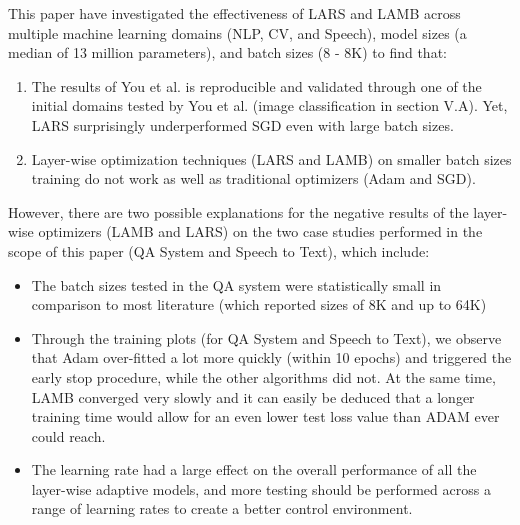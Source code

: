 This paper have investigated the effectiveness of LARS and LAMB across multiple machine learning domains (NLP, CV, and Speech), model sizes (a median of 13 million parameters), and batch sizes (8 - 8K) to find that:  

\begin{enumerate}
    \item The results of You et al. is reproducible and validated through  one of the initial domains tested by You et al.  \cite{You2020Large} (image classification in section V.A). Yet, LARS surprisingly underperformed SGD even with large batch sizes.
    \item Layer-wise optimization techniques (LARS and LAMB) on smaller batch sizes training do not work as well as traditional optimizers (Adam and SGD). 
\end{enumerate}

However, there are two possible explanations for the negative results of the layer-wise optimizers (LAMB and LARS) on the two case studies performed in the scope of this paper (QA System and Speech to Text), which include: 
\begin{itemize}
    \item The batch sizes tested in the QA system were statistically small in comparison to most literature (which reported sizes of 8K and up to 64K)
    \item Through the training plots (for QA System and Speech to Text), we observe that Adam over-fitted a lot more quickly (within 10 epochs) and triggered the early stop procedure, while the other algorithms did not. At the same time, LAMB converged very slowly and it can easily be deduced that a longer training time would allow for an even lower test loss value than ADAM ever could reach.
    \item The learning rate had a large effect on the overall performance of all the layer-wise adaptive models, and more testing should be performed across a range of learning rates to create a better control environment.
\end{itemize}

